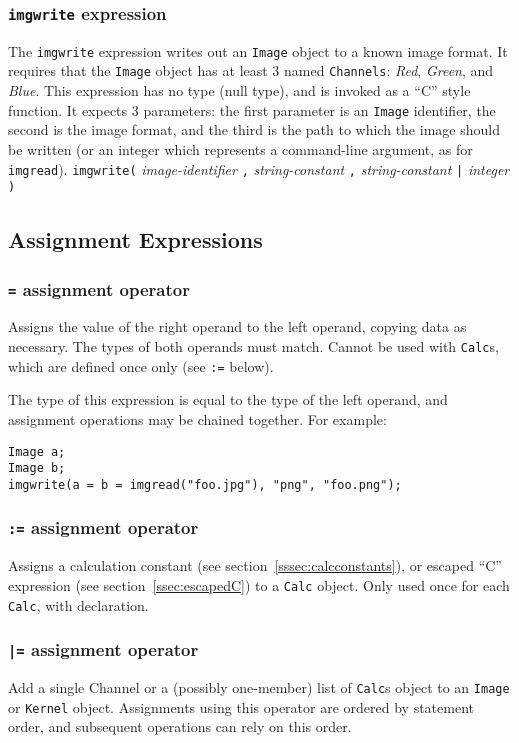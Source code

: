 \subsubsection{\texttt{imgwrite} expression}
\label{sssec:imgwrite}
The \texttt{imgwrite} expression writes out an \texttt{Image} object to a known
image format. It requires that the \texttt{Image} object has at least 3 named
\texttt{Channels}: \emph{Red}, \emph{Green}, and \emph{Blue}.
This expression has no type (null type), and is invoked as a ``C'' style function.
It expects 3 parameters: the first parameter is an \texttt{Image} identifier, the
second is the image format, and the third is the path to which the image
should be written (or an integer which represents a command-line argument, as for
\texttt{imgread}).
\startsyn
\texttt{imgwrite(} \emph{image-identifier} \texttt{,} \emph{string-constant} \texttt{,} \emph{string-constant} \texttt{|} \emph{integer} \texttt{)}
\stopsyn

\subsection{Assignment Expressions}
\label{ssec:assignment}

\subsubsection{\texttt{=} assignment operator}
\label{sssec:equalop}
Assigns the value of the right operand to the left operand, copying data as necessary.
The types of both operands must match. Cannot be used with \texttt{Calc}s, which are
defined once only (see \texttt{:=} below).

The type of this expression is equal to the type of the left operand, and assignment
operations may be chained together. For example:
\begin{lstlisting}[language=CLAM]
Image a;
Image b;
imgwrite(a = b = imgread("foo.jpg"), "png", "foo.png");
\end{lstlisting}

\subsubsection{\texttt{:=} assignment operator}
\label{sssec:colonequalop}
Assigns a calculation constant (see section~\ref{sssec:calcconstants}), or
escaped ``C'' expression (see section~\ref{ssec:escapedC}) to a \texttt{Calc}
object. Only used once for each \texttt{Calc}, with declaration.

\subsubsection{\texttt{|=} assignment operator}
\label{sssec:barequalop}
Add a single Channel or a (possibly one-member) list of \texttt{Calc}s object to an \texttt{Image} or
\texttt{Kernel} object. Assignments using this operator are ordered by statement
order, and subsequent operations can rely on this order.
